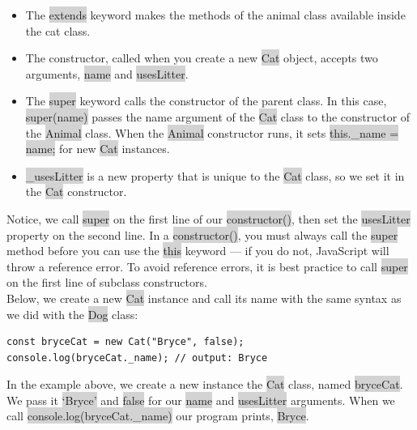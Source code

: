 \documentclass[11pt]{article}
\begin{document}
\begin{itemize}[leftmargin = *]
\item The \colorbox{lightgray}{extends} keyword makes the methods of the animal class available inside the cat class.
\item The constructor, called when you create a new \colorbox{lightgray}{Cat} object, accepts two arguments, \colorbox{lightgray}{name} and \colorbox{lightgray}{usesLitter}.
\item The \colorbox{lightgray}{super} keyword calls the constructor of the parent class. In this case, \colorbox{lightgray}{super(name)} passes the name argument of the \colorbox{lightgray}{Cat} class to the constructor of the \colorbox{lightgray}{Animal} class. When the \colorbox{lightgray}{Animal} constructor runs, it sets \colorbox{lightgray}{this.\_name = name;} for new \colorbox{lightgray}{Cat} instances.
\item \colorbox{lightgray}{\_usesLitter} is a new property that is unique to the \colorbox{lightgray}{Cat} class, so we set it in the \colorbox{lightgray}{Cat} constructor.
\end{itemize}
Notice, we call \colorbox{lightgray}{super} on the first line of our \colorbox{lightgray}{constructor()}, then set the \colorbox{lightgray}{usesLitter} property on the second line. In a \colorbox{lightgray}{constructor()}, you must always call the \colorbox{lightgray}{super} method before you can use the \colorbox{lightgray}{this} keyword — if you do not, JavaScript will throw a reference error. To avoid reference errors, it is best practice to call \colorbox{lightgray}{super} on the first line of subclass constructors. \\
\newline
Below, we create a new \colorbox{lightgray}{Cat} instance and call its name with the same syntax as we did with the \colorbox{lightgray}{Dog} class:
\begin{lstlisting}
const bryceCat = new Cat("Bryce", false); 
console.log(bryceCat._name); // output: Bryce
\end{lstlisting}
In the example above, we create a new instance the \colorbox{lightgray}{Cat} class, named \colorbox{lightgray}{bryceCat}. We pass it \colorbox{lightgray}{`Bryce'} and \colorbox{lightgray}{false} for our \colorbox{lightgray}{name} and \colorbox{lightgray}{usesLitter} arguments. When we call \colorbox{lightgray}{console.log(bryceCat.\_name)} our program prints, \colorbox{lightgray}{Bryce}. \\
\newline
\end{document}

